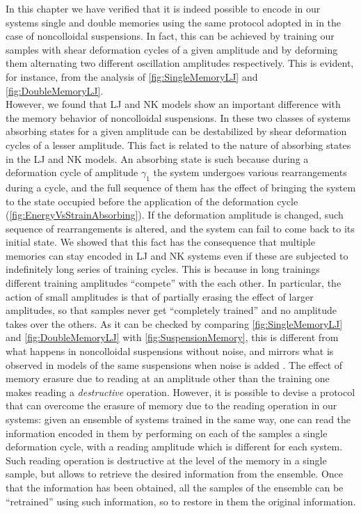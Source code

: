 In this chapter we have verified that it is indeed possible to encode in our systems single and double memories using the same protocol adopted in \cite{keim2011generic} in the case of noncolloidal suspensions. In fact, this can be achieved by training our samples with shear deformation cycles of a given amplitude and by deforming them alternating two different oscillation amplitudes respectively. This is evident, for instance, from the analysis of \autoref{fig:SingleMemoryLJ} and \autoref{fig:DoubleMemoryLJ}.\\
However, we found that LJ and NK models show an important difference with the memory behavior of noncolloidal suspensions. In these two classes of systems absorbing states for a given amplitude can be destabilized by shear deformation cycles of a lesser amplitude. This fact is related to the nature of absorbing states in the LJ and NK models. An absorbing state is such because during a deformation cycle of amplitude $\gamma_{1}$ the system undergoes various rearrangements during a cycle, and the full sequence of them has the effect of bringing the system to the state occupied before the application of the deformation cycle (\autoref{fig:EnergyVsStrainAbsorbing}). If the deformation amplitude is changed, such sequence of rearrangements is altered, and the system can fail to come back to its initial state. 
We showed that this fact has the consequence that multiple memories can stay encoded in LJ and NK systems even if these are subjected to indefinitely long series of training cycles. This is because in long trainings different training amplitudes ``compete'' with the each other. In particular, the action of small amplitudes is that of partially erasing the effect of larger amplitudes, so that samples never get ``completely trained'' and no amplitude takes over the others. As it can be checked by comparing \autoref{fig:SingleMemoryLJ} and \autoref{fig:DoubleMemoryLJ} with \autoref{fig:SuspensionMemory}, this is different from what happens in noncolloidal suspensions without noise, and mirrors what is observed in models of the same suspensions when noise is added \cite{keim2011generic}.
The effect of memory erasure due to reading at an amplitude other than the training one makes reading a \emph{destructive} operation.
However, it is possible to devise a protocol that can overcome the erasure of memory due to the reading operation in our systems: given an ensemble of systems trained in the same way, one can read the information encoded in them by performing on each of the samples a single deformation cycle, with a reading amplitude which is different for each system. Such reading operation is destructive at the level of the memory in a single sample, but allows to retrieve the desired information from the ensemble. Once that the information has been obtained, all the samples of the ensemble can be ``retrained'' using such information, so to restore in them the original information.

